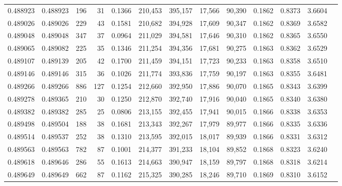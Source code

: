 \begin{tabular}{rrrrrrrrrrrrr}
0.488923 & 0.488923 &   196 &    31 &                                     0.1366 & 210,453 & 395,157 &  17,566 &  90,390 & 0.1862 & 0.8373 & 3.6604 \\
0.489026 & 0.489026 &   229 &    43 &                                     0.1581 & 210,682 & 394,928 &  17,609 &  90,347 & 0.1862 & 0.8369 & 3.6582 \\
0.489048 & 0.489048 &   347 &    37 &                                     0.0964 & 211,029 & 394,581 &  17,646 &  90,310 & 0.1862 & 0.8365 & 3.6550 \\
0.489065 & 0.489082 &   225 &    35 &                                     0.1346 & 211,254 & 394,356 &  17,681 &  90,275 & 0.1863 & 0.8362 & 3.6529 \\
0.489107 & 0.489139 &   205 &    42 &                                     0.1700 & 211,459 & 394,151 &  17,723 &  90,233 & 0.1863 & 0.8358 & 3.6510 \\
0.489146 & 0.489146 &   315 &    36 &                                     0.1026 & 211,774 & 393,836 &  17,759 &  90,197 & 0.1863 & 0.8355 & 3.6481 \\
0.489266 & 0.489266 &   886 &   127 &                                     0.1254 & 212,660 & 392,950 &  17,886 &  90,070 & 0.1865 & 0.8343 & 3.6399 \\
0.489278 & 0.489365 &   210 &    30 &                                     0.1250 & 212,870 & 392,740 &  17,916 &  90,040 & 0.1865 & 0.8340 & 3.6380 \\
0.489382 & 0.489382 &   285 &    25 &                                     0.0806 & 213,155 & 392,455 &  17,941 &  90,015 & 0.1866 & 0.8338 & 3.6353 \\
0.489498 & 0.489504 &   188 &    38 &                                     0.1681 & 213,343 & 392,267 &  17,979 &  89,977 & 0.1866 & 0.8335 & 3.6336 \\
0.489514 & 0.489537 &   252 &    38 &                                     0.1310 & 213,595 & 392,015 &  18,017 &  89,939 & 0.1866 & 0.8331 & 3.6312 \\
0.489563 & 0.489563 &   782 &    87 &                                     0.1001 & 214,377 & 391,233 &  18,104 &  89,852 & 0.1868 & 0.8323 & 3.6240 \\
0.489618 & 0.489646 &   286 &    55 &                                     0.1613 & 214,663 & 390,947 &  18,159 &  89,797 & 0.1868 & 0.8318 & 3.6214 \\
0.489649 & 0.489649 &   662 &    87 &                                     0.1162 & 215,325 & 390,285 &  18,246 &  89,710 & 0.1869 & 0.8310 & 3.6152 \\

\end{tabular}
